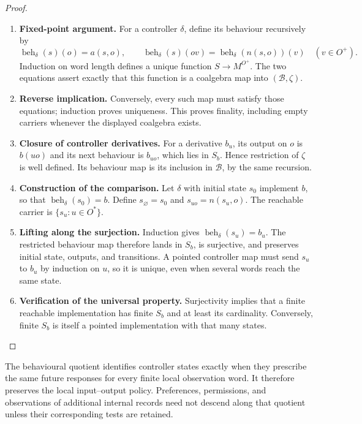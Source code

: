 \documentclass[11pt,a4paper]{article}
\numberwithin{equation}{section}
\theoremstyle{definition}
\theoremstyle{remark}
\theoremstyle{plain}
\begin{document}
\begin{proof}
\leavevmode
\begin{enumerate}[label=\textup{(\arabic*)},leftmargin=*,itemsep=4pt,topsep=3pt]
  \item \textbf{Fixed-point argument.} For a controller $\delta$, define its behaviour recursively by
\[
 \operatorname{beh}_\delta(s)(o)=a(s,o),\qquad
 \operatorname{beh}_\delta(s)(ov)
   =\operatorname{beh}_\delta(n(s,o))(v)
       \quad(v\in O^+).
\]
Induction on word length defines a unique function
$S\to M^{O^+}$. The two equations assert exactly that this
function is a coalgebra map into $(\mathcal B,\zeta)$.
  \item \textbf{Reverse implication.} Conversely, every such map must satisfy those equations;
induction proves uniqueness. This proves finality, including
empty carriers whenever the displayed coalgebra exists.
  \item \textbf{Closure of controller derivatives.} For a derivative $b_u$, its output on $o$ is $b(uo)$ and
its next behaviour is $b_{uo}$, which lies in $S_b$. Hence restriction of $\zeta$ is well defined. Its behaviour
map is its inclusion in $\mathcal B$, by the same recursion.
  \item \textbf{Construction of the comparison.} Let $\delta$ with initial state $s_0$ implement $b$, so that
$\operatorname{beh}_\delta(s_0)=b$. Define
$s_{\varnothing}=s_0$ and $s_{uo}=n(s_u,o)$. The reachable carrier is $\{s_u:u\in O^*\}$.
  \item \textbf{Lifting along the surjection.} Induction gives
$\operatorname{beh}_\delta(s_u)=b_u$. The restricted behaviour map therefore lands in $S_b$,
is surjective, and preserves initial state, outputs, and
transitions. A pointed controller map must send $s_u$ to
$b_u$ by induction on $u$, so it is unique, even when several
words reach the same state.
  \item \textbf{Verification of the universal property.} Surjectivity implies that a
finite reachable implementation has finite $S_b$ and at
least its cardinality. Conversely, finite $S_b$ is itself
a pointed implementation with that many states.
\end{enumerate}
\end{proof}


The behavioural quotient identifies controller states exactly when
they prescribe the same future responses for every finite local
observation word. It therefore preserves the local input--output policy.
Preferences, permissions, and observations of additional internal
records need not descend along that quotient unless their corresponding
tests are retained.
\end{document}
